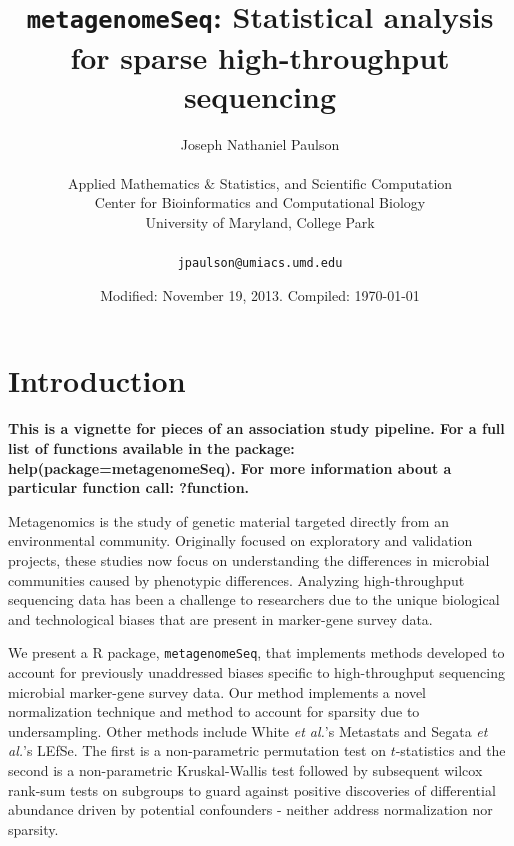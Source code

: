 \documentclass[a4paper,11pt]{article}\usepackage[]{graphicx}\usepackage[]{color}
\begin{document}
\title{{\textbf{\texttt{metagenomeSeq}: Statistical analysis for sparse high-throughput sequencing}}}
\author{Joseph Nathaniel Paulson\\[1em]\\ Applied Mathematics $\&$ Statistics, and Scientific Computation\\ Center for Bioinformatics and Computational Biology\\ University of Maryland, College Park\\[1em]\\ \texttt{jpaulson@umiacs.umd.edu}}
\date{Modified: November 19, 2013. Compiled: \today}
\maketitle
\tableofcontents

\newpage




\section{Introduction}
\textbf{This is a vignette for pieces of an association study pipeline. For a full list of functions available in the package: help(package=metagenomeSeq). For more information about a particular function call: ?function.}

Metagenomics is the study of genetic material targeted directly from an environmental community. 
Originally focused on exploratory and validation projects, these studies now focus on understanding the differences in microbial communities caused by phenotypic differences. 
Analyzing high-throughput sequencing data has been a challenge to researchers due to the unique biological and technological biases that are present in marker-gene survey data.

 We present a R package, \texttt{metagenomeSeq}, that implements methods developed to account for previously unaddressed biases specific to high-throughput sequencing microbial marker-gene survey data. Our method implements a novel normalization technique and method to account for sparsity due to undersampling. Other methods include
 White \textit{et al.}'s Metastats and Segata \textit{et al.}'s LEfSe. The first is a non-parametric permutation test on $t$-statistics and the second is a non-parametric Kruskal-Wallis test followed by subsequent wilcox rank-sum tests on subgroups to guard against positive discoveries of differential abundance driven by potential confounders - neither address normalization nor sparsity.
\end{document}
